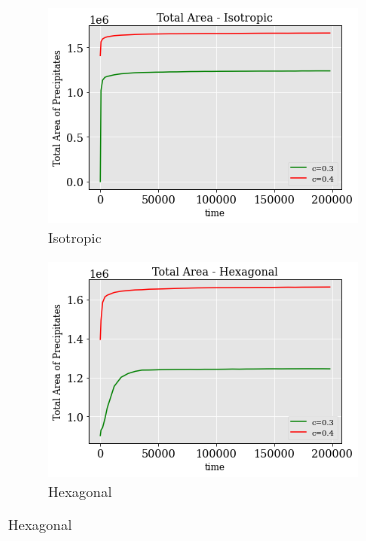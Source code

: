 \documentclass[12pt, a4paper]{report}
\begin{document}
\begin{figure}[H]
\centering
\begin{subfigure}{.45\textwidth}
  \centering
  \includegraphics[width=0.9\textwidth]{Pictures/Comparison/Radial Auto comparison/tot_iso.png}
  \caption{Isotropic}
  \label{img:microstrImg}
\end{subfigure}
\begin{subfigure}{.45\textwidth}
  \centering
  \includegraphics[width=0.9\textwidth]{Pictures/Comparison/Radial Auto comparison/tot_hex.png}
  \caption{Hexagonal}
  \label{img:microstrImg}
\end{subfigure}


\end{figure}
\end{document}
